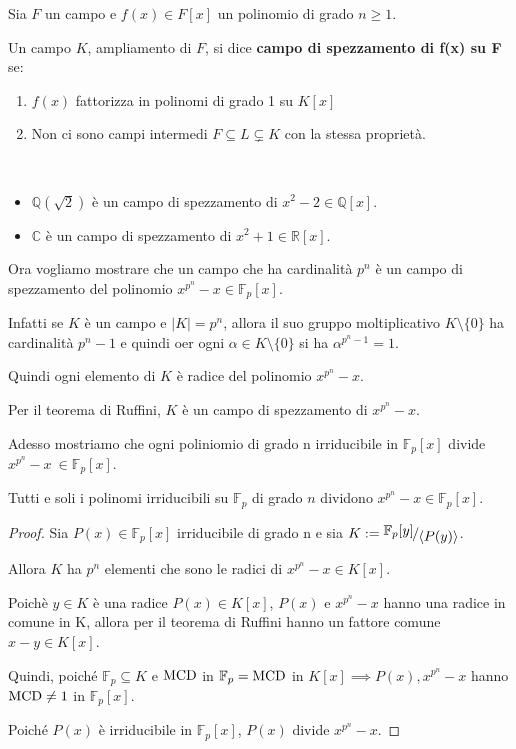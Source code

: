 \documentclass[../main.tex]{subfiles}
\begin{document}
\begin{definition}
    Sia $F$ un campo e $f(x) \in F[x]$ un polinomio di grado $n \geq 1$.

    Un campo $K$, ampliamento di $F$, si dice \textbf{campo di spezzamento di f(x) su F} se:
    \begin{enumerate}[label=(\roman*)]
        \item $f(x)$ fattorizza in polinomi di grado 1 su $K[x]$
        \item Non ci sono campi intermedi $F \subseteq L \subsetneq K$ con la stessa proprietà.
    \end{enumerate}
\end{definition}

\begin{example}\
    \begin{itemize}
        \item $\mathbb{Q}(\sqrt{2})$ è un campo di spezzamento di $x^2 - 2 \in \mathbb{Q}[x]$.
        \item $\mathbb{C}$ è un campo di spezzamento di $x^2 + 1 \in \mathbb{R}[x]$.
    \end{itemize}
\end{example}

Ora vogliamo mostrare che un campo che ha cardinalità $p^n$ è un campo di spezzamento del polinomio $x^{p^n} - x \in \mathbb{F}_p[x]$.

Infatti se $K$ è un campo e $|K| = p^n$, allora il suo gruppo moltiplicativo $K \setminus \{0\}$ ha cardinalità $p^n - 1$ e quindi oer ogni $\alpha \in K \setminus \{0\}$ si ha $\alpha^{p^n - 1} = 1$.

Quindi ogni elemento di $K$ è radice del polinomio $x^{p^n} - x$.

Per il teorema di Ruffini, $K$ è un campo di spezzamento di $x^{p^n} - x$.

Adesso mostriamo che ogni poliniomio di grado n irriducibile in $\mathbb{F}_p[x]$ divide $x^{p^n} - x\ \in \mathbb{F}_p[x]$.

\begin{proposition}
    Tutti e soli i polinomi irriducibili su $\mathbb{F}_p$ di grado $n$ dividono $x^{p^n} - x \in \mathbb{F}_p[x]$.
\end{proposition}

\begin{proof}
    Sia $P(x) \in \mathbb{F}_p[x]$ irriducibile di grado n e sia $K := \nicefrac{\mathbb{F}_p[y]}{\langle P(y)\rangle}$.

    Allora $K$ ha $p^n$ elementi che sono le radici di $x^{p^n} - x \in K[x]$.

    Poichè $y \in K$ è una radice $P(x) \in K[x]$, $P(x)$ e $x^{p^n} - x$ hanno una radice in comune in K, allora per il teorema di Ruffini hanno un fattore comune $x - y \in K[x]$.

    Quindi, poiché $\mathbb{F}_p \subseteq K$ e $\operatorname{MCD}$ in $\mathbb{F}_p = \operatorname{MCD}$ in $K[x] \implies P(x), x^{p^n} - x$ hanno $\operatorname{MCD} \neq 1$ in $\mathbb{F}_p[x]$.

    Poiché $P(x)$ è irriducibile in $\mathbb{F}_p[x]$, $P(x)$ divide $x^{p^n} - x$.
\end{proof}
\end{document}
